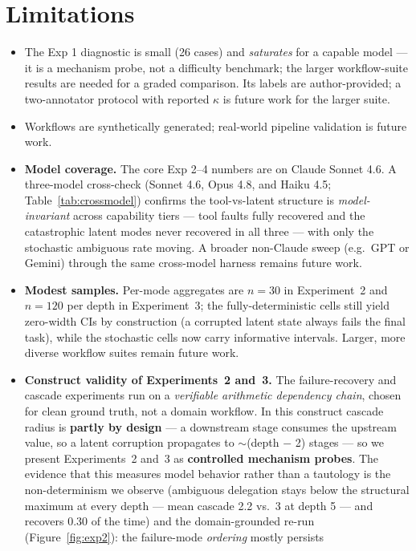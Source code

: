 \documentclass[sigconf,nonacm,anonymous]{acmart}  %
\begin{document}
\section{Limitations}
\label{sec:limitations}
\begin{itemize}
  \item The Exp 1 diagnostic is small (26 cases) and \emph{saturates} for a
  capable model --- it is a mechanism probe, not a difficulty benchmark; the
  larger workflow-suite results are needed for a graded comparison. Its labels
  are author-provided; a two-annotator protocol with reported $\kappa$ is future
  work for the larger suite.
  \item Workflows are synthetically generated; real-world pipeline validation is
  future work.
  \item \textbf{Model coverage.} The core Exp 2--4 numbers are on Claude Sonnet
  4.6. A three-model cross-check (Sonnet 4.6, Opus 4.8, and Haiku 4.5;
  Table~\ref{tab:crossmodel}) confirms the tool-vs-latent structure is
  \emph{model-invariant} across capability tiers --- tool faults fully recovered
  and the catastrophic latent modes never recovered in all three --- with only
  the stochastic ambiguous rate moving. A broader non-Claude sweep (e.g.\ GPT
  or Gemini) through the same cross-model harness remains future work.
  \item \textbf{Modest samples.} Per-mode aggregates are $n{=}30$ in
  Experiment~2 and $n{=}120$ per depth in Experiment~3; the fully-deterministic cells still yield zero-width
  CIs by construction (a corrupted latent state always fails the final task),
  while the stochastic cells now carry informative intervals. Larger, more
  diverse workflow suites remain future work.
  \item \textbf{Construct validity of Experiments~2 and~3.} The failure-recovery and cascade
  experiments run on a \emph{verifiable arithmetic dependency chain}, chosen for
  clean ground truth, not a domain workflow. In this construct cascade radius is
  \textbf{partly by design} --- a downstream stage consumes the upstream value,
  so a latent corruption propagates to $\sim$(depth $-$ 2) stages --- so we
  present Experiments~2 and~3 as \textbf{controlled mechanism probes}. The evidence that this
  measures model behavior rather than a tautology is the
  non-determinism we observe (ambiguous delegation stays below the structural
  maximum at every depth --- mean cascade 2.2 vs.\ 3 at depth 5 --- and recovers
  0.30 of the time) and the domain-grounded re-run
  (Figure~\ref{fig:exp2}): the failure-mode \emph{ordering} mostly persists

\end{itemize}
\end{document}
